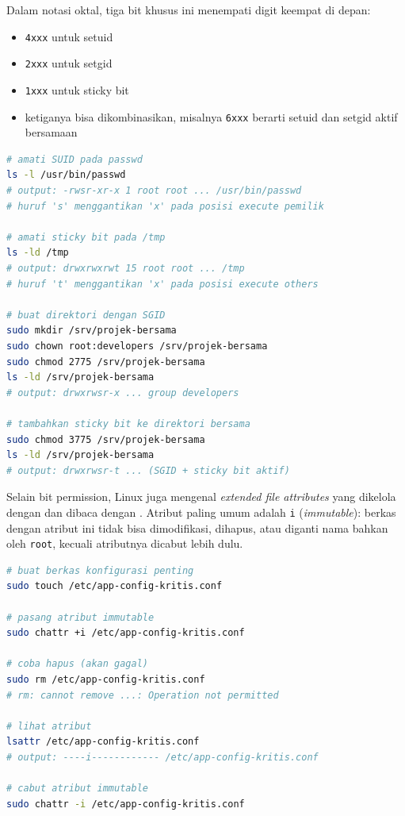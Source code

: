 Dalam notasi oktal, tiga bit khusus ini menempati digit keempat di depan:

\begin{itemize}
    \item \texttt{4xxx} untuk setuid
    \item \texttt{2xxx} untuk setgid
    \item \texttt{1xxx} untuk sticky bit
    \item ketiganya bisa dikombinasikan, misalnya \texttt{6xxx} berarti setuid dan setgid aktif bersamaan
\end{itemize}

\begin{lstlisting}[language=bash, caption={Mengamati dan menetapkan special bits}]
# amati SUID pada passwd
ls -l /usr/bin/passwd
# output: -rwsr-xr-x 1 root root ... /usr/bin/passwd
# huruf 's' menggantikan 'x' pada posisi execute pemilik

# amati sticky bit pada /tmp
ls -ld /tmp
# output: drwxrwxrwt 15 root root ... /tmp
# huruf 't' menggantikan 'x' pada posisi execute others

# buat direktori dengan SGID
sudo mkdir /srv/projek-bersama
sudo chown root:developers /srv/projek-bersama
sudo chmod 2775 /srv/projek-bersama
ls -ld /srv/projek-bersama
# output: drwxrwsr-x ... group developers

# tambahkan sticky bit ke direktori bersama
sudo chmod 3775 /srv/projek-bersama
ls -ld /srv/projek-bersama
# output: drwxrwsr-t ... (SGID + sticky bit aktif)
\end{lstlisting}

Selain bit permission, Linux juga mengenal \textit{extended file attributes} yang dikelola dengan  dan dibaca dengan . Atribut paling umum adalah \texttt{i} (\textit{immutable}): berkas dengan atribut ini tidak bisa dimodifikasi, dihapus, atau diganti nama bahkan oleh \texttt{root}, kecuali atributnya dicabut lebih dulu.

\begin{lstlisting}[language=bash, caption={Extended attributes dengan chattr dan lsattr}]
# buat berkas konfigurasi penting
sudo touch /etc/app-config-kritis.conf

# pasang atribut immutable
sudo chattr +i /etc/app-config-kritis.conf

# coba hapus (akan gagal)
sudo rm /etc/app-config-kritis.conf
# rm: cannot remove ...: Operation not permitted

# lihat atribut
lsattr /etc/app-config-kritis.conf
# output: ----i------------ /etc/app-config-kritis.conf

# cabut atribut immutable
sudo chattr -i /etc/app-config-kritis.conf
\end{lstlisting}

